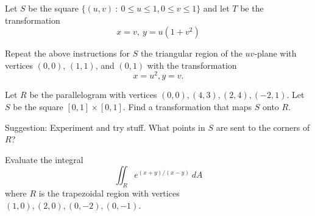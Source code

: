 \documentclass[12pt]{exam}
\begin{document}
\begin{questions}

\question Let \(S\) be the square \(\{(u,v)~:~0\le u \le 1,0\le v\le 1\}\) and let \(T\) be the transformation
    \[
        x=v,~y=u(1+v^2)
    \]

\question Repeat the above instructions for \(S\) the triangular region of the \(uv\)-plane with vertices \((0,0)\), \((1,1)\), and \((0,1)\) with the transformation
\[
        x=u^2,y=v.
\]
\ifprintanswers
        \begin{solution}
        \end{solution}
    \else
        \vfill
    \fi

\newpage

\question Let \(R\) be the parallelogram with vertices \((0,0), (4,3), (2,4), (-2,1)\). Let \(S\) be the square \([0,1]\times[0,1]\). Find a transformation that maps \(S\) onto \(R\).

Suggestion: Experiment and try stuff. What points in \(S\) are sent to the corners of \(R\)?
\ifprintanswers
        \begin{solution}
        \end{solution}
    \else
        \vfill
    \fi 

\question Evaluate the integral 
\[
        \iint_R e^{(x+y)/(x-y)}~dA
\]
where \(R\) is the trapezoidal region with vertices \((1,0), (2,0), (0,-2), (0,-1)\).
\end{questions}
\end{document}
